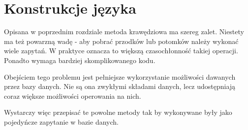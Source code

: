 \chapter{Konstrukcje języka}

% 
% 
% 


Opisana w poprzednim rozdziale metoda krawędziowa ma szereg zalet.
Niestety ma też powarzną wadę - aby pobrać przodków lub potomków należy wykonać wiele zapytań.
W praktyce oznacza to większą czasochłonność takiej operacji. 
Ponadto wymaga bardziej skomplikowanego kodu.

Obejściem tego problemu jest pełniejsze wykorzystanie możliwości dawanych przez bazy danych.
Nie są ona zwykłymi składami danych, lecz udostępniają coraz większe możliwości operowania na nich.


Wystarczy więc przepisać te powolne metody tak by wykonywane były jako pojedyńcze zapytanie w bazie danych.

